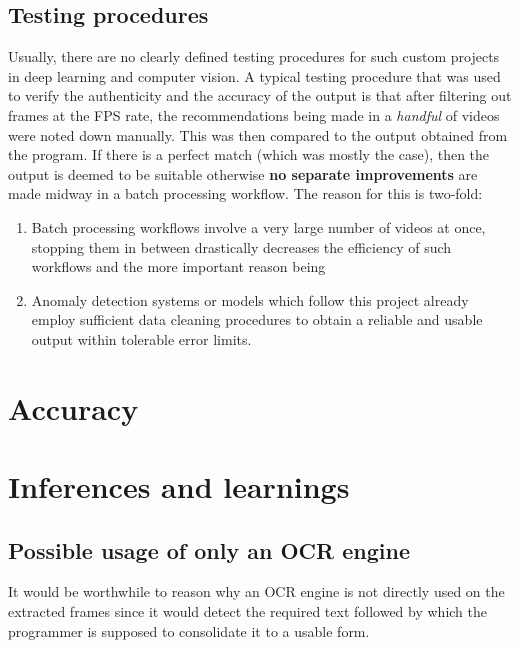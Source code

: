 \subsection{Testing procedures}

Usually, there are no clearly defined testing procedures for such
custom projects in deep learning and computer vision. A typical
testing procedure that was used to verify the authenticity and the
accuracy of the output is that after filtering out frames at the FPS
rate, the recommendations being made in a \textit{handful} of videos
were noted down manually. This was then compared to the output
obtained from the program. If there is a perfect match (which was
mostly the case), then the output is deemed to be suitable otherwise
\textbf{no separate improvements} are made midway in a batch
processing workflow. The reason for this is two-fold:

\begin{enumerate}

  \item Batch processing workflows involve a very large number of
    videos at once, stopping them in between drastically decreases
    the efficiency of such workflows and the more important reason being

  \item Anomaly detection systems or models which follow this project
    already employ sufficient data cleaning procedures to obtain a
    reliable and usable output within tolerable error limits.

\end{enumerate}

\section{Accuracy}

\section{Inferences and learnings}

\subsection{Possible usage of only an OCR engine}

It would be worthwhile to reason why an OCR engine is not directly
used on the extracted frames since it would detect the required text
followed by which the programmer is supposed to consolidate it to a
usable form. \par

